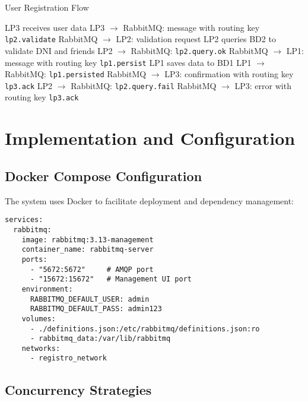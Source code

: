 \documentclass[10pt,a4paper]{article}
\theoremstyle{definition}
\theoremstyle{remark}
\begin{document}
\begin{algorithm}
\caption{User Registration Flow}
\begin{algorithmic}[1]
    \State LP3 receives user data
    \State LP3 $\rightarrow$ RabbitMQ: message with routing key \texttt{lp2.validate}
    \State RabbitMQ $\rightarrow$ LP2: validation request
    \State LP2 queries BD2 to validate DNI and friends
        \State LP2 $\rightarrow$ RabbitMQ: \texttt{lp2.query.ok}
        \State RabbitMQ $\rightarrow$ LP1: message with routing key \texttt{lp1.persist}
        \State LP1 saves data to BD1
        \State LP1 $\rightarrow$ RabbitMQ: \texttt{lp1.persisted}
        \State RabbitMQ $\rightarrow$ LP3: confirmation with routing key \texttt{lp3.ack}
    \Else
        \State LP2 $\rightarrow$ RabbitMQ: \texttt{lp2.query.fail}
        \State RabbitMQ $\rightarrow$ LP3: error with routing key \texttt{lp3.ack}
    \EndIf
\EndProcedure
\end{algorithmic}
\end{algorithm}

\section{Implementation and Configuration}

\subsection{Docker Compose Configuration}

The system uses Docker to facilitate deployment and dependency management:

\begin{lstlisting}[style=jsonStyle, caption={Docker Compose Configuration for RabbitMQ}]
services:
  rabbitmq:
    image: rabbitmq:3.13-management
    container_name: rabbitmq-server
    ports:
      - "5672:5672"     # AMQP port
      - "15672:15672"   # Management UI port
    environment:
      RABBITMQ_DEFAULT_USER: admin
      RABBITMQ_DEFAULT_PASS: admin123
    volumes:
      - ./definitions.json:/etc/rabbitmq/definitions.json:ro
      - rabbitmq_data:/var/lib/rabbitmq
    networks:
      - registro_network
\end{lstlisting}

\subsection{Concurrency Strategies}
\end{document}
